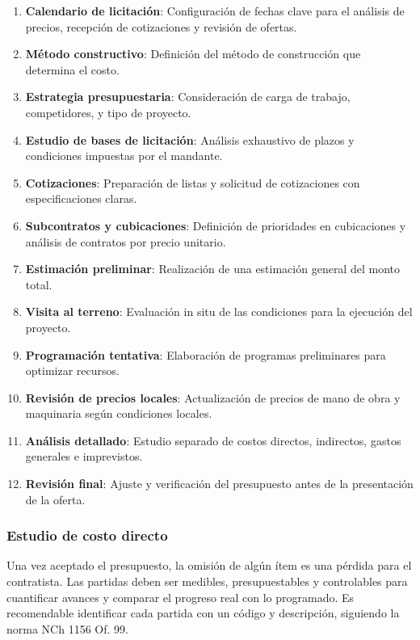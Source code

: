 \begin{enumerate}
    \item \textbf{Calendario de licitación}: Configuración de fechas clave para el análisis de precios, recepción de cotizaciones y revisión de ofertas.
    \item \textbf{Método constructivo}: Definición del método de construcción que determina el costo.
    \item \textbf{Estrategia presupuestaria}: Consideración de carga de trabajo, competidores, y tipo de proyecto.
    \item \textbf{Estudio de bases de licitación}: Análisis exhaustivo de plazos y condiciones impuestas por el mandante.
    \item \textbf{Cotizaciones}: Preparación de listas y solicitud de cotizaciones con especificaciones claras.
    \item \textbf{Subcontratos y cubicaciones}: Definición de prioridades en cubicaciones y análisis de contratos por precio unitario.
    \item \textbf{Estimación preliminar}: Realización de una estimación general del monto total.
    \item \textbf{Visita al terreno}: Evaluación in situ de las condiciones para la ejecución del proyecto.
    \item \textbf{Programación tentativa}: Elaboración de programas preliminares para optimizar recursos.
    \item \textbf{Revisión de precios locales}: Actualización de precios de mano de obra y maquinaria según condiciones locales.
    \item \textbf{Análisis detallado}: Estudio separado de costos directos, indirectos, gastos generales e imprevistos.
    \item \textbf{Revisión final}: Ajuste y verificación del presupuesto antes de la presentación de la oferta.
\end{enumerate}

\subsubsection{Estudio de costo directo}

Una vez aceptado el presupuesto, la omisión de algún ítem es una pérdida para el contratista. Las partidas deben ser medibles, presupuestables y controlables para cuantificar avances y comparar el progreso real con lo programado. Es recomendable identificar cada partida con un código y descripción, siguiendo la norma NCh 1156 Of. 99.

